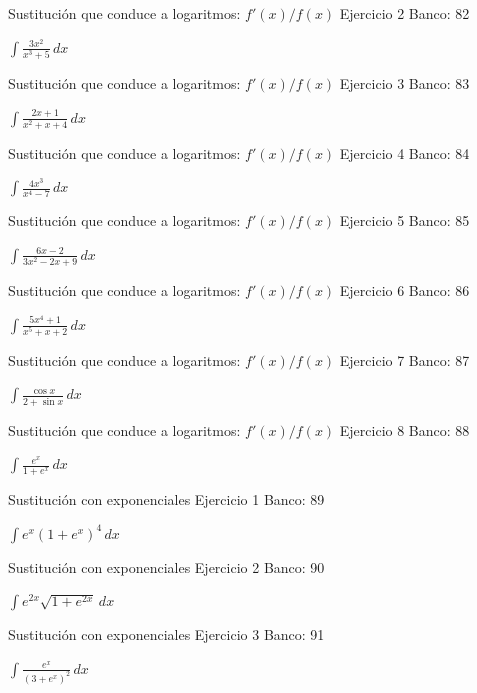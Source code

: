 \documentclass[aspectratio=169,12pt]{beamer}
\newcommand{\ejercicio}[1]{%
  \begin{center}
  \vfill
  {\fontsize{24}{30}\selectfont #1}
  \vfill
  \end{center}
}
\begin{document}
\begin{frame}{Sustitución que conduce a logaritmos: $f'(x)/f(x)$}
\small Ejercicio 2 \hfill Banco: 82
\ejercicio{$\displaystyle \int\frac{3x^2}{x^3+5}\,dx$}
\end{frame}

\begin{frame}{Sustitución que conduce a logaritmos: $f'(x)/f(x)$}
\small Ejercicio 3 \hfill Banco: 83
\ejercicio{$\displaystyle \int\frac{2x+1}{x^2+x+4}\,dx$}
\end{frame}

\begin{frame}{Sustitución que conduce a logaritmos: $f'(x)/f(x)$}
\small Ejercicio 4 \hfill Banco: 84
\ejercicio{$\displaystyle \int\frac{4x^3}{x^4-7}\,dx$}
\end{frame}

\begin{frame}{Sustitución que conduce a logaritmos: $f'(x)/f(x)$}
\small Ejercicio 5 \hfill Banco: 85
\ejercicio{$\displaystyle \int\frac{6x-2}{3x^2-2x+9}\,dx$}
\end{frame}

\begin{frame}{Sustitución que conduce a logaritmos: $f'(x)/f(x)$}
\small Ejercicio 6 \hfill Banco: 86
\ejercicio{$\displaystyle \int\frac{5x^4+1}{x^5+x+2}\,dx$}
\end{frame}

\begin{frame}{Sustitución que conduce a logaritmos: $f'(x)/f(x)$}
\small Ejercicio 7 \hfill Banco: 87
\ejercicio{$\displaystyle \int\frac{\cos x}{2+\sin x}\,dx$}
\end{frame}

\begin{frame}{Sustitución que conduce a logaritmos: $f'(x)/f(x)$}
\small Ejercicio 8 \hfill Banco: 88
\ejercicio{$\displaystyle \int\frac{e^x}{1+e^x}\,dx$}
\end{frame}

\begin{frame}{Sustitución con exponenciales}
\small Ejercicio 1 \hfill Banco: 89
\ejercicio{$\displaystyle \int e^x(1+e^x)^4\,dx$}
\end{frame}

\begin{frame}{Sustitución con exponenciales}
\small Ejercicio 2 \hfill Banco: 90
\ejercicio{$\displaystyle \int e^{2x}\sqrt{1+e^{2x}}\,dx$}
\end{frame}

\begin{frame}{Sustitución con exponenciales}
\small Ejercicio 3 \hfill Banco: 91
\ejercicio{$\displaystyle \int\frac{e^x}{(3+e^x)^2}\,dx$}
\end{frame}
\end{document}
